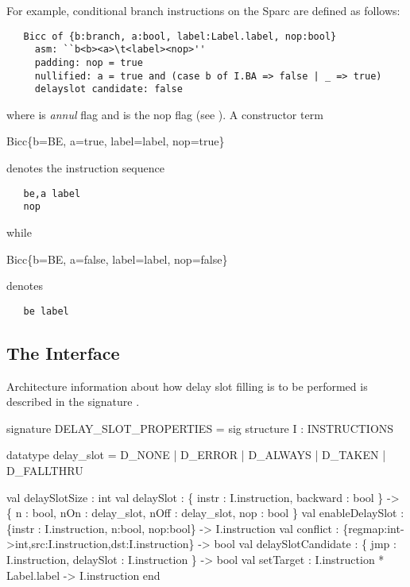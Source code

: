 For example, conditional branch instructions on the Sparc are defined 
as follows:
\begin{verbatim}
   Bicc of {b:branch, a:bool, label:Label.label, nop:bool}
     asm: ``b<b><a>\t<label><nop>''
     padding: nop = true
     nullified: a = true and (case b of I.BA => false | _ => true)
     delayslot candidate: false
\end{verbatim}
\noindent where  is \emph{annul} flag and  is the nop 
flag (see ).
A constructor term
\begin{SML}
   Bicc\{b=BE, a=true, label=label, nop=true\}
\end{SML}
denotes the instruction sequence
\begin{verbatim}
   be,a label
   nop
\end{verbatim}
while
\begin{SML}
   Bicc\{b=BE, a=false, label=label, nop=false\}
\end{SML}
denotes 
\begin{verbatim}
   be label
\end{verbatim}


\subsection{The Interface}

Architecture information about how delay slot filling is to be performed
is described in the signature
.
\begin{SML}
signature DELAY_SLOT_PROPERTIES =
sig
   structure I : INSTRUCTIONS

   datatype delay_slot = 
     D_NONE   | D_ERROR   | D_ALWAYS  
   | D_TAKEN  | D_FALLTHRU 

   val delaySlotSize : int 
   val delaySlot : \{ instr : I.instruction, backward : bool \} -> 
		   \{ n    : bool,      
		     nOn  : delay_slot,
		     nOff : delay_slot,
		     nop  : bool      
		   \} 
   val enableDelaySlot : 
	 \{instr : I.instruction, n:bool, nop:bool\} -> I.instruction
   val conflict : 
         \{regmap:int->int,src:I.instruction,dst:I.instruction\} -> bool
   val delaySlotCandidate : 
         \{ jmp : I.instruction, delaySlot : I.instruction \} -> bool
   val setTarget : I.instruction * Label.label -> I.instruction
end
\end{SML}


